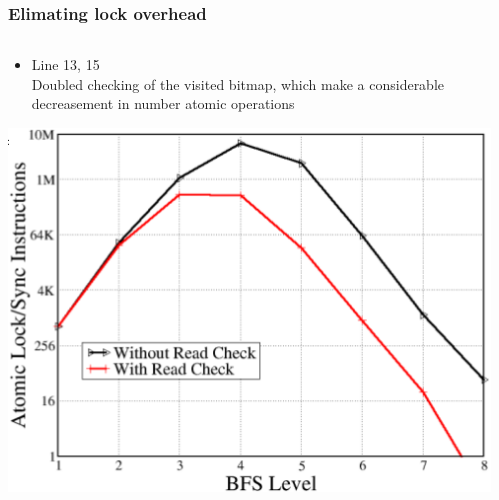 \documentclass[]{beamer}
\begin{document}
\begin{frame}
  \frametitle{Elimating lock overhead}
  \begin{columns}
    \begin{column}{.5\textwidth}
      \begin{itemize}
        \item Line 13, 15\\
          Doubled checking of the visited bitmap, which make a considerable
          decreasement in number atomic operations
      \end{itemize}
      \includegraphics[width=\textwidth]{figures/sc10-lock-elimation}
    \end{column}
    \begin{column}{.5\textwidth}

\end{column}
\end{columns}
\end{frame}
\end{document}
